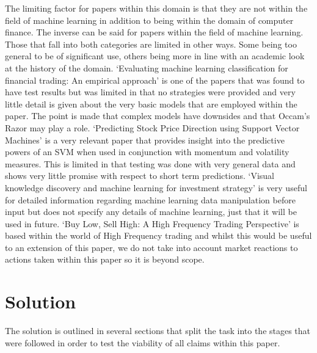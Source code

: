 \documentclass[conference]{IEEEtran}
\begin{document}
The limiting factor for papers within this domain is that they are not within the field of machine learning in addition to being within the domain of computer finance. The inverse can be said for papers within the field of machine learning. Those that fall into both categories are limited in other ways. Some being too general to be of significant use, others being more in line with an academic look at the history of the domain. `Evaluating machine learning classification for financial trading: An empirical approach' \cite{Gerlein2016} is one of the papers that was found to have test results but was limited in that no strategies were provided and very little detail is given about the very basic models that are employed within the paper. The point is made that complex models have downsides and that Occam's Razor may play a role. `Predicting Stock Price Direction using Support Vector Machines' \cite{MadgeAdvisor} is a very relevant paper that provides insight into the predictive powers of an SVM when used in conjunction with momentum and volatility measures. This is limited in that testing was done with very general data and shows very little promise with respect to short term predictions. `Visual knowledge discovery and machine learning for investment strategy' \cite{Wilinski2017} is very useful for detailed information regarding machine learning data manipulation before input but does not specify any details of machine learning, just that it will be used in future. `Buy Low, Sell High: A High Frequency Trading Perspective' \cite{Cartea2014} is based within the world of High Frequency trading and whilst this would be useful to an extension of this paper, we do not take into account market reactions to actions taken within this paper so it is beyond scope.

\section{Solution}

The solution is outlined in several sections that split the task into the stages that were followed in order to test the viability of all claims within this paper.
\end{document}
